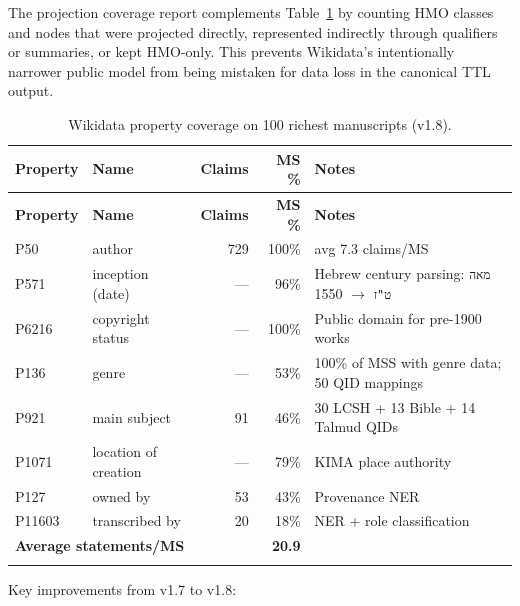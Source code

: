 \documentclass[12pt]{article}
\newcommand{\code}[1]{\texttt{#1}}
\begin{document}
The projection coverage report complements Table~\ref{tbl:wikidata-coverage} by counting HMO classes and nodes that were projected directly, represented indirectly through qualifiers or summaries, or kept HMO-only. This prevents Wikidata's intentionally narrower public model from being mistaken for data loss in the canonical TTL output.

\begin{longtable}{|l|p{3.5cm}|r|r|p{4cm}|}
\hline
\textbf{Property} & \textbf{Name} & \textbf{Claims} & \textbf{MS \%} & \textbf{Notes} \\
\hline
\endfirsthead
\hline
\textbf{Property} & \textbf{Name} & \textbf{Claims} & \textbf{MS \%} & \textbf{Notes} \\
\hline
\endhead
\hline
\endfoot
P50 & author & 729 & 100\% & avg 7.3 claims/MS \\
\hline
P571 & inception (date) & --- & 96\% & Hebrew century parsing: \code{מאה ט"ז} $\to$ 1550 \\
\hline
P6216 & copyright status & --- & 100\% & Public domain for pre-1900 works \\
\hline
P136 & genre & --- & 53\% & 100\% of MSS with genre data; 50 QID mappings \\
\hline
P921 & main subject & 91 & 46\% & 30 LCSH + 13 Bible + 14 Talmud QIDs \\
\hline
P1071 & location of creation & --- & 79\% & KIMA place authority \\
\hline
P127 & owned by & 53 & 43\% & Provenance NER \\
\hline
P11603 & transcribed by & 20 & 18\% & NER + role classification \\
\hline
\multicolumn{2}{|l|}{\textbf{Average statements/MS}} & \multicolumn{2}{r|}{\textbf{20.9}} & \\
\hline
\caption{Wikidata property coverage on 100 richest manuscripts (v1.8).}
\label{tbl:wikidata-coverage}
\end{longtable}

\noindent Key improvements from v1.7 to v1.8:
\end{document}
